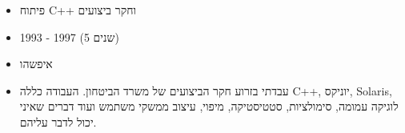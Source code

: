 \documentclass[
  hebrew,
]{article}
\providecommand{\tightlist}{%
  \setlength{\itemsep}{0pt}\setlength{\parskip}{0pt}}
\begin{document}
\begin{itemize}
  \begin{itemize}
  \tightlist
  \item
    פיתוח C++ וחקר ביצועים
  \item
    1993 - 1997 (5 שנים)
  \item
    איפשהו
  \item
    עבדתי בזרוע חקר הביצועים של משרד הביטחון. העבודה כללה C++, יוניקס,
    Solaris, לוגיקה עמומה, סימולציות, סטטיסטיקה, מיפוי, עיצוב ממשקי
    משתמש ועוד דברים שאיני יכול לדבר עליהם.
  \end{itemize}
\end{itemize}
\end{document}
